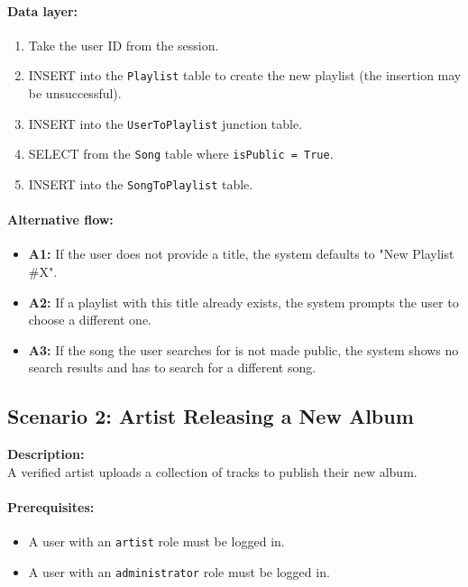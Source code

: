\documentclass[11pt, a4paper]{article}
\begin{document}
\paragraph{Data layer:}
\begin{enumerate}
    \item Take the user ID from the session.
    \item INSERT into the \texttt{Playlist} table to create the new playlist (the insertion may be unsuccessful).
    \item INSERT into the \texttt{UserToPlaylist} junction table.
    \item SELECT from the \texttt{Song} table where \texttt{isPublic = True}.
    \item INSERT into the \texttt{SongToPlaylist} table.
\end{enumerate}

\paragraph{Alternative flow:}
\begin{itemize}
    \item \textbf{A1:} If the user does not provide a title, the system defaults to "New Playlist \#X".
    \item \textbf{A2:} If a playlist with this title already exists, the system prompts the user to choose a different one.
    \item \textbf{A3:} If the song the user searches for is not made public, the system shows no search results and has to search for a different song.
\end{itemize}

\subsection{Scenario 2: Artist Releasing a New Album}

\textbf{Description:}\\
A verified artist uploads a collection of tracks to publish their new album.

\paragraph{Prerequisites:}
\begin{itemize}
    \item A user with an \texttt{artist} role must be logged in.
    \item A user with an \texttt{administrator} role must be logged in.
\end{itemize}
\end{document}
